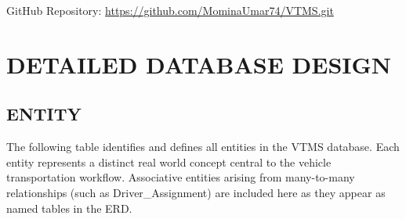 \documentclass[12pt,a4paper]{report}
\begin{document}
GitHub Repository: \url{https://github.com/MominaUmar74/VTMS.git}

\chapter{DETAILED DATABASE DESIGN}

\section{ENTITY}

The following table identifies and defines all entities in the VTMS database. Each entity represents a distinct real world concept central to the vehicle transportation workflow. Associative entities arising from many-to-many relationships (such as Driver\_Assignment) are included here as they appear as named tables in the ERD.
\end{document}

